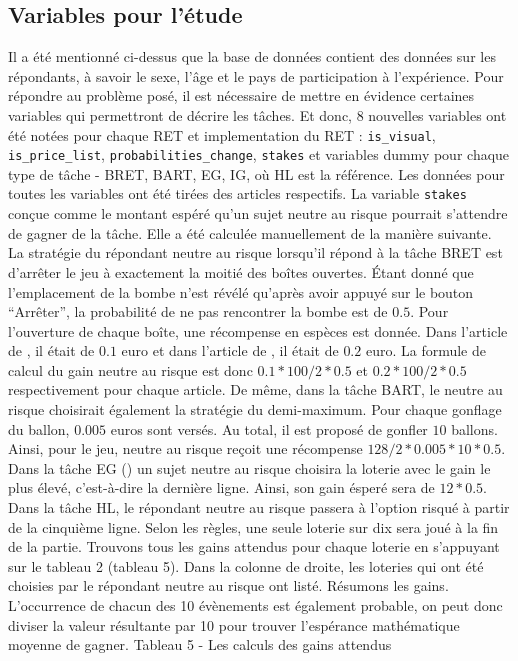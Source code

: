 \documentclass[12pt]{article}
\begin{document}
\subsection{Variables pour l'étude}

Il a été mentionné ci-dessus que la base de données contient des données
sur les répondants, à savoir le sexe, l'âge et le pays de participation
à l'expérience. Pour répondre au problème posé, il est nécessaire de
mettre en évidence certaines variables qui permettront de décrire les
tâches. Et donc, 8 nouvelles variables ont été notées pour chaque RET et
implementation du RET : \texttt{is\_visual}, \texttt{is\_price\_list},
\texttt{probabilities\_change}, \texttt{stakes} et variables dummy pour
chaque type de tâche - BRET, BART, EG, IG, où HL est la référence. Les
données pour toutes les variables ont été tirées des articles
respectifs. La variable \texttt{stakes} conçue comme le montant espéré
qu'un sujet neutre au risque pourrait s'attendre de gagner de la tâche.
Elle a été calculée manuellement de la manière suivante. La stratégie du
répondant neutre au risque lorsqu'il répond à la tâche BRET est
d'arrêter le jeu à exactement la moitié des boîtes ouvertes. Étant donné
que l'emplacement de la bombe n'est révélé qu'après avoir appuyé sur le
bouton ``Arrêter'', la probabilité de ne pas rencontrer la bombe est de
\(0.5\). Pour l'ouverture de chaque boîte, une récompense en espèces est
donnée. Dans l'article de \citet{Crosetto2013}, il était de \(0.1\) euro
et dans l'article de \citet{Crosetto2016}, il était de \(0.2\) euro. La
formule de calcul du gain neutre au risque est donc
\(0.1 * 100 / 2 * 0.5\) et \(0.2 * 100 / 2 * 0.5\) respectivement pour
chaque article. De même, dans la tâche BART, le neutre au risque
choisirait également la stratégie du demi-maximum. Pour chaque gonflage
du ballon, \(0.005\) euros sont versés. Au total, il est proposé de
gonfler \(10\) ballons. Ainsi, pour le jeu, neutre au risque reçoit une
récompense \(128 / 2 * 0.005 * 10 * 0.5\). Dans la tâche EG
(\citet{Crosetto2016}) un sujet neutre au risque choisira la loterie
avec le gain le plus élevé, c'est-à-dire la dernière ligne. Ainsi, son
gain ésperé sera de \(12 * 0.5\). Dans la tâche HL, le répondant neutre
au risque passera à l'option risqué à partir de la cinquième ligne.
Selon les règles, une seule loterie sur dix sera joué à la fin de la
partie. Trouvons tous les gains attendus pour chaque loterie en
s'appuyant sur le tableau 2 (tableau 5). Dans la colonne de droite, les
loteries qui ont été choisies par le répondant neutre au risque ont
listé. Résumons les gains. L'occurrence de chacun des 10 évènements est
également probable, on peut donc diviser la valeur résultante par 10
pour trouver l'espérance mathématique moyenne de gagner. \newpage
Tableau 5 - Les calculs des gains attendus
\end{document}
